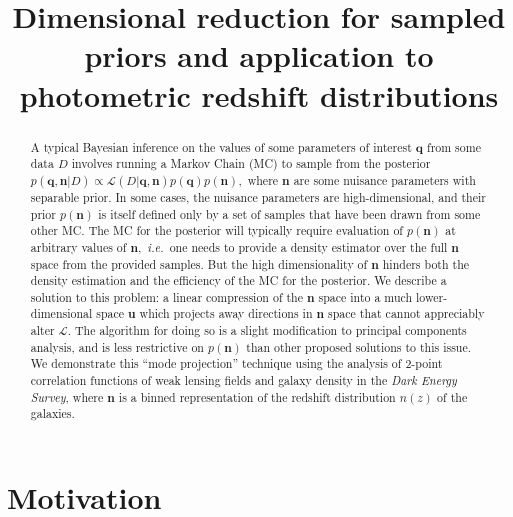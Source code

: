 \documentclass[onecolumn,resetfootnote]{aastex7}
\newcommand{\ie}{\textit{i.e.}}
\newcommand{\vecq}{\ensuremath{\mathbf{q}}}
\newcommand{\vecn}{\ensuremath{\mathbf{n}}}
\newcommand{\vecu}{\ensuremath{\mathbf{u}}}
\newcommand{\likeli}{\mathcal{L}}
\begin{document}
\title{Dimensional reduction for sampled priors and application to
photometric redshift distributions}




\begin{abstract}
A typical Bayesian inference on the values of some parameters of
interest $\vecq$ from some data $D$ involves running a Markov Chain (MC) to sample
from the posterior $p(\vecq,\vecn | D) \propto \likeli(D | \vecq,\vecn)
p(\vecq) p(\vecn),$ where $\vecn$ are some nuisance parameters with
  separable prior.  In some
cases, the nuisance parameters are high-dimensional, and their
prior $p(\vecn)$ is itself defined only by a set of samples that have
been drawn from some other MC.  
The MC for the posterior will typically require evaluation of
$p(\vecn)$ at arbitrary values of $\vecn,$ \ie\ one needs to provide a
density estimator over the full $\vecn$ space from the provided
samples.  But the high dimensionality of $\vecn$ hinders both the
density estimation and the efficiency of the MC for the posterior.  We
describe a solution to this problem: a linear compression of the
$\vecn$ space into a much lower-dimensional space $\vecu$ which
projects away directions in $\vecn$ space that cannot appreciably
alter $\likeli.$ The algorithm for doing so is a slight modification
to principal components analysis, and is less restrictive on
$p(\vecn)$ than other proposed solutions to this issue.
We demonstrate this ``mode projection'' technique using the analysis
of 2-point correlation functions of weak lensing fields and galaxy
density in the \textit{Dark Energy Survey}, where $\vecn$ is a binned representation of the redshift distribution
$n(z)$ of the galaxies.
\end{abstract}


\section{Motivation} \label{sec:intro}
\end{document}
